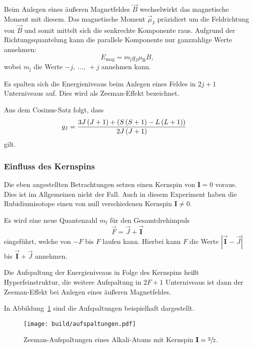 Beim Anlegen eines äußeren Magnetfeldes $\vec{B}$ wechselwirkt das magnetische Moment mit diesem.
Das magnetische Moment $\vec{\mu}_{\text{J}}$ präzidiert um die Feldrichtung von
$\vec{B}$ und somit mittelt sich die senkrechte Komponente raus.
Aufgrund der Richtungsquantelung kann die parallele Komponente nur ganzzahlige Werte annehmen:
\begin{equation}
  E_\text{mag} = m_\text{j} g_{\text{J}} \mu_\text{B} B,
\end{equation}
wobei $m_\text{j}$ die Werte $-j,~\ldots,~+j$ annehmen kann.

Es spalten sich die Energieniveaus beim Anlegen eines Feldes in $2j + 1$ Unterniveaus auf.
Dies wird als Zeeman-Effekt bezeichnet.

Aus dem Cosinus-Satz folgt, dass
\begin{align}
  \label{eq:g_j}
  g_\text{J} &= \frac{%
    3 J \left(J + 1\right) + \left(S\left(S + 1\right) - L \left(L + 1\right)\right)
  }{2 J \left(J + 1\right)}
\end{align}
gilt.


\subsubsection{Einfluss des Kernspins}%
\label{sub:einfluss_des_kernspins}

Die eben angestellten Betrachtungen setzen einen Kernspin von $\mathbf{I} = 0$
voraus.
Dies ist im Allgemeinen nicht der Fall.
Auch in diesem Experiment haben die Rubidiumisotope einen von null verschiedenen Kernspin
$\mathbf{I} \neq 0$.

Es wird eine neue Quantenzahl $m_\text{f}$ für den Gesamtdrehimpuls
\begin{equation}
  \vec{F} = \vec{J} + \vec{\mathbf{I}}
\end{equation}
eingeführt, welche von $-F$ bis $F$ laufen kann.
Hierbei kann $F$ die Werte
$\left|\vec{\mathbf{I}} - \vec{J}\right|$ bis $\vec{\mathbf{I}} + \vec{J}$
annehmen.

Die Aufspaltung der Energieniveaus in Folge des Kernspins heißt
Hyperfeinstruktur, die weitere Aufspaltung in $2F + 1$ Unterniveaus ist dann
der Zeeman-Effekt bei Anlegen eines äußeren Magnetfeldes.

In Abbildung~\ref{fig:aufspaltungen} sind die Aufspaltungen beispielhaft
dargestellt.

\begin{figure}[ht]
  \centering
  \texttt{[image: build/aufspaltungen.pdf]}
  \caption{%
    Zeeman-Aufspaltungen eines Alkali-Atoms mit Kernspin $\mathbf{I}
    = \sfrac{3}{2}$.\cite{anleitung}%
  }%
  \label{fig:aufspaltungen}
\end{figure}

